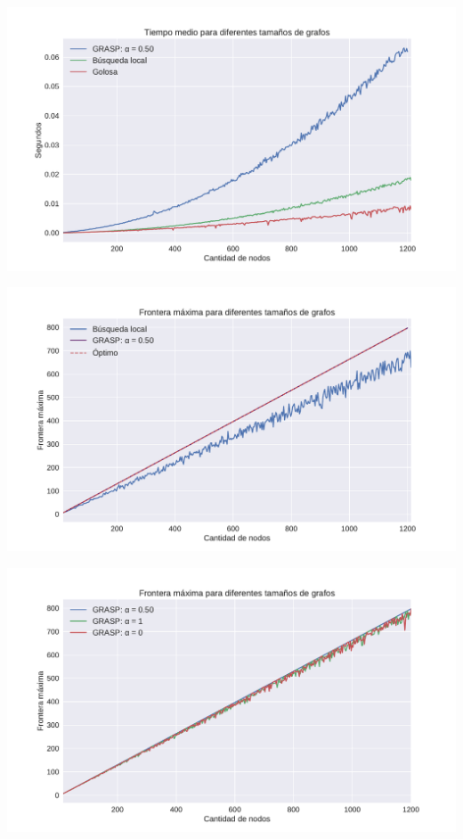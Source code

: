 {\centering
    \includegraphics[width=1\textwidth]{informe/imgs/exp_malo_tiempo_grasp_local_greedy.pdf}
}

{\centering
    \includegraphics[width=1\textwidth]{informe/imgs/exp_malo_frontera_grasp_local_optimo.pdf}
}

{\centering
    \includegraphics[width=1\textwidth]{informe/imgs/exp_malo_frontera_grasp.pdf}
}

